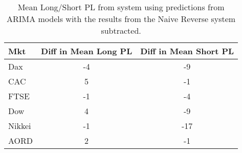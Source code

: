 \begin{table}[ht]
\centering
\caption[Mean PL from ARIMA models minus mean PL from Naive Reverse system]{Mean Long/Short PL from system using predictions from ARIMA models with the results from the Naive Reverse system subtracted.} 
\label{tab:chp_ts:arima1_diff}
\begin{tabular}{lcc}
  \toprule Mkt & Diff in Mean Long PL & Diff in Mean Short PL \\ 
  \midrule Dax & -4 & -9 \\ 
  CAC & 5 & -1 \\ 
  FTSE & -1 & -4 \\ 
  Dow & 4 & -9 \\ 
  Nikkei & -1 & -17 \\ 
  AORD & 2 & -1 \\ 
   \bottomrule \end{tabular}
\end{table}
